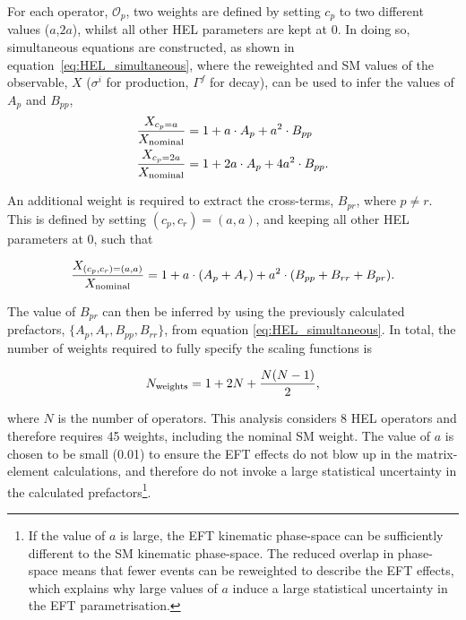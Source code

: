 For each operator, $\mathcal{O}_p$, two weights are defined by setting $c_p$ to two different values ($a$,$2a$), whilst all other HEL parameters are kept at 0. In doing so, simultaneous equations are constructed, as shown in equation~\ref{eq:HEL_simultaneous}, where the reweighted and SM values of the observable, $X$ ($\sigma^i$ for production, $\Gamma^f$ for decay), can be used to infer the values of $A_p$ and $B_{pp}$,
\begin{equation}\label{eq:HEL_simultaneous}
    \begin{split}
        \frac{X_{c_p=a}}{X_{\rm{nominal}}} &= 1 + a \cdot A_p + a^2 \cdot B_{pp} \\
        \frac{X_{c_p=2a}}{X_{\rm{nominal}}} &= 1 + 2a \cdot A_p + 4a^2 \cdot B_{pp}.
    \end{split}
\end{equation}

\noindent
An additional weight is required to extract the cross-terms, $B_{pr}$, where $p \neq r$. This is defined by setting $(c_p,c_r)=(a,a)$, and keeping all other HEL parameters at 0, such that

\begin{equation}
    \frac{X_{(c_p,c_r)=(a,a)}}{X_{\rm{nominal}}} = 1 + a \cdot (A_p+A_r) + a^2 \cdot (B_{pp}+B_{rr}+B_{pr}).
\end{equation}

\noindent
The value of $B_{pr}$ can then be inferred by using the previously calculated prefactors, $\{A_p,A_r,B_{pp},B_{rr}\}$, from equation \ref{eq:HEL_simultaneous}. In total, the number of weights required to fully specify the scaling functions is

\begin{equation}
    N_{\rm{weights}} = 1 + 2N + \frac{N(N-1)}{2},
\end{equation}

\noindent
where $N$ is the number of operators. This analysis considers 8 HEL operators and therefore requires 45 weights, including the nominal SM weight. The value of $a$ is chosen to be small (0.01) to ensure the EFT effects do not blow up in the matrix-element calculations, and therefore do not invoke a large statistical uncertainty in the calculated prefactors\footnote{If the value of $a$ is large, the EFT kinematic phase-space can be sufficiently different to the SM kinematic phase-space. The reduced overlap in phase-space means that fewer events can be reweighted to describe the EFT effects, which explains why large values of $a$ induce a large statistical uncertainty in the EFT parametrisation.}. 

